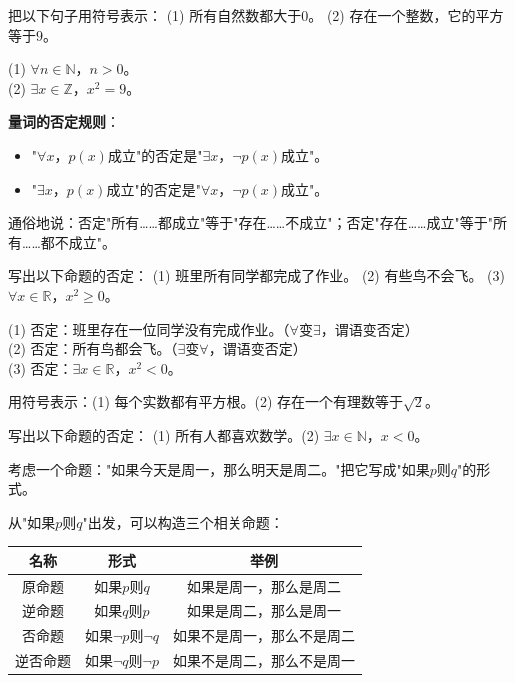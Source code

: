 \begin{example}
把以下句子用符号表示：
(1) 所有自然数都大于$0$。
(2) 存在一个整数，它的平方等于$9$。
\end{example}
\begin{solution}
(1) $\forall n\in\mathbb N$，$n>0$。\\
(2) $\exists x\in\mathbb Z$，$x^2=9$。
\end{solution}

\textbf{量词的否定规则}：
\begin{itemize}
\item "$\forall x$，$p(x)$成立"的否定是"$\exists x$，$\lnot p(x)$成立"。
\item "$\exists x$，$p(x)$成立"的否定是"$\forall x$，$\lnot p(x)$成立"。
\end{itemize}

通俗地说：否定"所有……都成立"等于"存在……不成立"；否定"存在……成立"等于"所有……都不成立"。

\begin{example}
写出以下命题的否定：
(1) 班里所有同学都完成了作业。
(2) 有些鸟不会飞。
(3) $\forall x\in\mathbb R$，$x^2\ge0$。
\end{example}
\begin{solution}
(1) 否定：班里存在一位同学没有完成作业。（$\forall$变$\exists$，谓语变否定）\\
(2) 否定：所有鸟都会飞。（$\exists$变$\forall$，谓语变否定）\\
(3) 否定：$\exists x\in\mathbb R$，$x^2<0$。
\end{solution}

\begin{exercise}
\item 用符号表示：(1) 每个实数都有平方根。\qquad (2) 存在一个有理数等于$\sqrt2$。
\item 写出以下命题的否定：
(1) 所有人都喜欢数学。\qquad (2) $\exists x\in\mathbb N$，$x<0$。
\end{exercise}


考虑一个命题："如果今天是周一，那么明天是周二。"把它写成"如果$p$则$q$"的形式。

从"如果$p$则$q$"出发，可以构造三个相关命题：

\begin{center}
\begin{tabular}{c|c|c}
名称 & 形式 & 举例 \\ \hline
原命题 & 如果$p$则$q$ & 如果是周一，那么是周二 \\
逆命题 & 如果$q$则$p$ & 如果是周二，那么是周一 \\
否命题 & 如果$\lnot p$则$\lnot q$ & 如果不是周一，那么不是周二 \\
逆否命题 & 如果$\lnot q$则$\lnot p$ & 如果不是周二，那么不是周一
\end{tabular}
\end{center}


